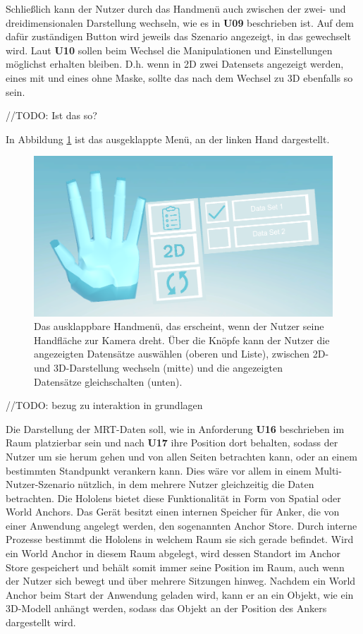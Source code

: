 Schließlich kann der Nutzer durch das Handmenü auch zwischen der zwei- und dreidimensionalen Darstellung wechseln, wie es in \textbf{U09} beschrieben ist. Auf dem dafür zuständigen Button wird jeweils das Szenario angezeigt, in das gewechselt wird.
Laut \textbf{U10} sollen beim Wechsel die Manipulationen und Einstellungen möglichst erhalten bleiben. D.h. wenn in 2D zwei Datensets angezeigt werden, eines mit und eines ohne Maske, sollte das nach dem Wechsel zu 3D ebenfalls so sein. 

//TODO: Ist das so?

In Abbildung \ref{img:handUI} ist das ausgeklappte Menü, an der linken Hand dargestellt.

\begin{figure}
	\centering
	\includegraphics[width=0.7\linewidth]{images/handUI.png}
	\caption{Das ausklappbare Handmenü, das erscheint, wenn der Nutzer seine Handfläche zur Kamera dreht. Über die Knöpfe kann der Nutzer die angezeigten Datensätze auswählen (oberen und Liste), zwischen 2D- und 3D-Darstellung wechseln (mitte) und die angezeigten Datensätze gleichschalten (unten). }
	\label{img:handUI}
\end{figure}

//TODO:
bezug zu interaktion in grundlagen

Die Darstellung der MRT-Daten soll, wie in Anforderung \textbf{U16} beschrieben im Raum platzierbar sein und nach \textbf{U17} ihre Position dort behalten, sodass der Nutzer um sie herum gehen und von allen Seiten betrachten kann, oder an einem bestimmten Standpunkt verankern kann. Dies wäre vor allem in einem Multi-Nutzer-Szenario nützlich, in dem mehrere Nutzer gleichzeitig die Daten betrachten.
Die Hololens bietet diese Funktionalität in Form von Spatial oder World Anchors. Das Gerät besitzt einen internen Speicher für Anker, die von einer Anwendung angelegt werden, den sogenannten Anchor Store. Durch interne Prozesse bestimmt die Hololens in welchem Raum sie sich gerade befindet. Wird ein World Anchor in diesem Raum abgelegt, wird dessen Standort im Anchor Store gespeichert und behält somit immer seine Position im Raum, auch wenn der Nutzer sich bewegt und über mehrere Sitzungen hinweg. Nachdem ein World Anchor beim Start der Anwendung geladen wird, kann er an ein Objekt, wie ein 3D-Modell anhängt werden, sodass das Objekt an der Position des Ankers dargestellt wird. 

